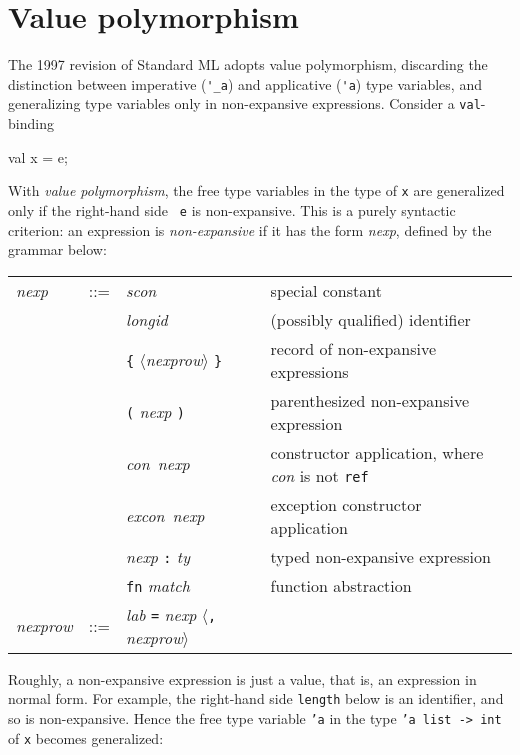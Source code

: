 \documentclass[fleqn]{article}
\begin{document}
\section{Value polymorphism}
\label{sec-valuepoly}

The 1997 revision of Standard ML \cite{Milner:1997:TheDefinition}
adopts value polymorphism, discarding the distinction between
imperative (\verb#'_a#) and applicative (\verb#'a#) type variables,
and generalizing type variables only in non-expansive expressions.
Consider a {\tt val}-binding

\begin{program}
val x = e;
\end{program}

\noindent With {\em value polymorphism\/}, the free type variables in
the type of {\tt x} are generalized only if the right-hand side {\tt
  e} is non-expansive.  This is a purely syntactic criterion: an
expression is {\em non-expansive\/} if it has the form {\it nexp\/},
defined by the grammar below:

\begin{quot} 
\begin{tabular}{@{}lcll}
{\it nexp} & ::= & {\it scon\/}  & special constant\\
&& {\it longid\/} & (possibly qualified) identifier\\           
&& \verb#{# $\langle${\it nexprow\/}$\rangle$ \verb#}# & record of
non-expansive expressions\\
&& \verb#(# {\it nexp\/} \verb#)# & parenthesized non-expansive expression\\
&& {\it con\/}\ {\it nexp\/} & constructor application, where {\it con\/}
is not {\tt ref}\\
&& {\it excon\/}\ {\it nexp\/} & exception constructor application\\
&& {\it nexp} \verb#:# {\it ty\/} & typed non-expansive expression\\
&& \verb#fn# {\it match} & function abstraction\\[2ex]

{\it nexprow} & ::= & {\it lab\/} \verb#=# {\it nexp\/}
$\langle$\verb#,# {\it nexprow\/}$\rangle$  \\
\end{tabular}
\end{quot}

\noindent Roughly, a non-expansive expression is just a value, that
is, an expression in normal form.  For example, the right-hand side
{\tt length} below is an identifier, and so is non-expansive.  Hence
the free type variable {\tt 'a} in the type {\tt 'a list -> int} of
{\tt x} becomes generalized:
\end{document}
